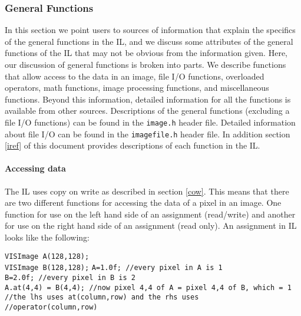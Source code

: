 \subsubsection{General Functions}
\label{il_gf}
In this section we point users to sources of information that explain 
the specifics of the general functions in the IL, and we discuss some 
attributes of the general functions of the IL that may not be obvious 
from the information given.  Here, our discussion of general functions 
is broken into parts.  We describe functions that allow access to the 
data in an image, file I/O functions, overloaded operators, math 
functions, image processing functions, and miscellaneous functions.  
Beyond this information, detailed information for all the functions is 
available from other sources.  Descriptions of the general functions 
(excluding a file I/O functions) can be found in the {\tt image.h} 
header file.  Detailed information about file I/O can be found in the 
{\tt imagefile.h} header file.  In addition section \ref{iref} of this 
document provides descriptions of each function in the IL.

\paragraph{Accessing data}
The IL uses copy on write as described in section \ref{cow}.
This means that there are two different functions for accessing the
data of a pixel in an image.  One function for use on the left hand
side of an assignment (read/write) 
and another for use on the right hand side of
an assignment (read only).  An assignment in IL looks like the following:
\begin{list}{}{\setlength{\partopsep}{-1in}
\setlength{\topsep}{0in} \setlength{\labelwidth}{1in}
\setlength{\leftmargin}{0.5in} \setlength{\labelsep}{0.2in}}
\item {\tt VISImage A(128,128);}\\
{\tt VISImage B(128,128);}
{\tt A=1.0f; //every pixel in A is 1}\\
{\tt B=2.0f; //every pixel in B is 2}\\
{\tt A.at(4,4) = B(4,4); //now pixel 4,4 of A = pixel 4,4 of B, which = 1}\\
{\tt                     //the lhs uses at(column,row) and the rhs uses}\\
{\tt                     //operator(column,row)}
\end{list}

